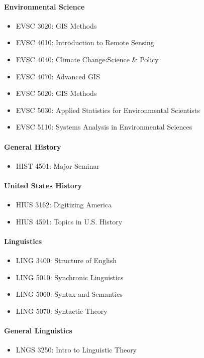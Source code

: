 \documentclass[10pt,letter]{book}
\newenvironment{itemlist}{
\begin{itemize}
\setlength{\itemsep}{0pt}
\setlength{\parskip}{0pt}}
{\end{itemize}}
\begin{document}
\paragraph{Environmental Science}
\begin{itemlist}
\item EVSC 3020: GIS Methods
\item EVSC 4010: Introduction to Remote Sensing
\item EVSC 4040: Climate Change:Science \& Policy
\item EVSC 4070: Advanced GIS
\item EVSC 5020: GIS Methods
\item EVSC 5030: Applied Statistics for Environmental Scientists
\item EVSC 5110: Systems Analysis in Environmental Sciences
\end{itemlist}

\paragraph{General History}
\begin{itemlist}
\item HIST 4501: Major Seminar
\end{itemlist}

\paragraph{United States History}
\begin{itemlist}
\item HIUS 3162: Digitizing America
\item HIUS 4591: Topics in U.S. History
\end{itemlist}

\paragraph{Linguistics}
\begin{itemlist}
\item LING 3400: Structure of English
\item LING 5010: Synchronic Linguistics
\item LING 5060: Syntax and Semantics
\item LING 5070: Syntactic Theory
\end{itemlist}

\paragraph{General Linguistics}
\begin{itemlist}
\item LNGS 3250: Intro to Linguistic Theory
\end{itemlist}
\end{document}
